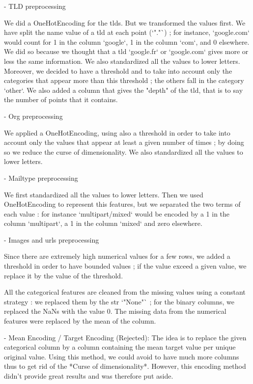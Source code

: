 \documentclass{article}
\begin{document}
\begin{markdown}
- TLD preprocessing

We did a OneHotEncoding for the tlds. But we transformed the values first. We have split the name value of a tld at each point (`"."`) ; for instance, `google.com` would count for 1 in the column `google`, 1 in the column `com`, and 0 elsewhere. We did so because we thought that a tld `google.fr` or `google.com` gives more or less the same information. We also standardized all the values to lower letters. Moreover, we decided to have a threshold and to take into account only the categories that appear more than this threshold ; the others fall in the category `other`. We also added a column that gives the "depth" of the tld, that is to say the number of points that it contains. 

- Org preprocessing

We applied a OneHotEncoding, using also a threshold in order to take into account only the values that appear at least a given number of times ; by doing so we reduce the curse of dimensionality. We also standardized all the values to lower letters. 

- Mailtype preprocessing

We first standardized all the values to lower letters. Then we used OneHotEncoding to represent this features, but we separated the two terms of each value : for instance `multipart/mixed` would be encoded by a 1 in the column `multipart`, a 1 in the column `mixed` and zero elsewhere. 


- Images and urls preprocessing

Since there are extremely high numerical values for a few rows, we added a threshold in order to have bounded values ; if the value exceed a given value, we replace it by the value of the threshold.

All the categorical features are cleaned from the missing values using a constant strategy : we replaced them by the str `"None"` ; for the binary columns, we replaced the NaNs with the value 0. The missing data from the numerical features were replaced by the mean of the column.

- Mean Encoding / Target Encoding (Rejected):
The idea is to replace the given categorical column by a column containing the mean target value per unique original value. Using this method, we could avoid to have much more columns thus to get rid of the *Curse of dimensionality*. However, this encoding method didn't provide great results and was therefore put aside.

\end{markdown}
\end{document}
